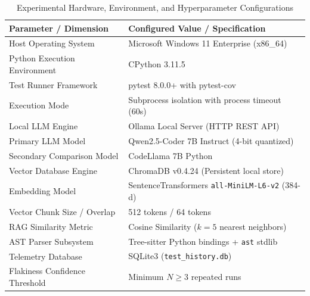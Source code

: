 \begin{table}[t]
\centering
\caption{Experimental Hardware, Environment, and Hyperparameter Configurations}
\label{tab:experimental_parameters}
\footnotesize
\begin{tabular}{ll}
\toprule
\textbf{Parameter / Dimension} & \textbf{Configured Value / Specification} \\
\midrule
Host Operating System & Microsoft Windows 11 Enterprise (x86\_64) \\
Python Execution Environment & CPython 3.11.5 \\
Test Runner Framework & pytest 8.0.0+ with pytest-cov \\
Execution Mode & Subprocess isolation with process timeout (60s) \\
Local LLM Engine & Ollama Local Server (HTTP REST API) \\
Primary LLM Model & Qwen2.5-Coder 7B Instruct (4-bit quantized) \\
Secondary Comparison Model & CodeLlama 7B Python \\
Vector Database Engine & ChromaDB v0.4.24 (Persistent local store) \\
Embedding Model & SentenceTransformers \texttt{all-MiniLM-L6-v2} (384-d) \\
Vector Chunk Size / Overlap & 512 tokens / 64 tokens \\
RAG Similarity Metric & Cosine Similarity ($k = 5$ nearest neighbors) \\
AST Parser Subsystem & Tree-sitter Python bindings + \texttt{ast} stdlib \\
Telemetry Database & SQLite3 (\texttt{test\_history.db}) \\
Flakiness Confidence Threshold & Minimum $N \ge 3$ repeated runs \\
\bottomrule
\end{tabular}
\end{table}
